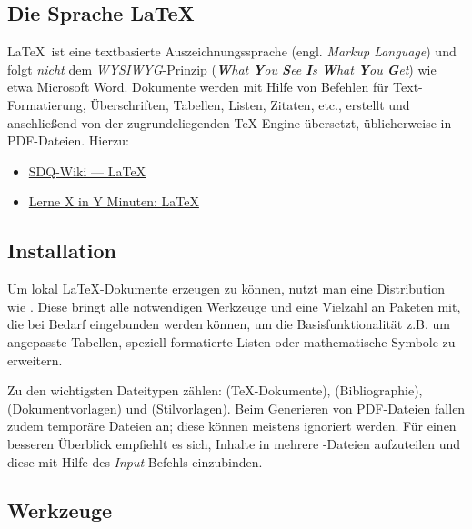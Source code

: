 \subsection{Die Sprache \LaTeX}%
\label{sec:Schreiben:Sprache}

\LaTeX\ ist eine textbasierte Auszeichnungssprache (engl. \emph{Markup Language}) und folgt \emph{nicht} dem \emph{WYSIWYG}-Prinzip (\emph{\textbf{W}hat \textbf{Y}ou \textbf{S}ee \textbf{I}s \textbf{W}hat \textbf{Y}ou \textbf{G}et}) wie etwa Microsoft Word.
Dokumente werden mit Hilfe von Befehlen für Text-Formatierung, Überschriften, Tabellen, Listen, Zitaten, etc., erstellt und anschließend von der zugrundeliegenden \TeX-Engine übersetzt, üblicherweise in PDF-Dateien.
Hierzu:

\smallskip
\begin{itemize}[label={\symbolInfo}]
    \item \href{https://sdqweb.ipd.kit.edu/wiki/LaTeX}{SDQ-Wiki --- LaTeX}
    \item \href{https://learnxinyminutes.com/docs/de-de/latex-de/}{Lerne X in Y Minuten: LaTeX}
\end{itemize}

\subsection{Installation}%
\label{sec:Schreiben:Installation}

Um lokal \LaTeX-Dokumente erzeugen zu können, nutzt man eine Distribution wie .
Diese bringt alle notwendigen Werkzeuge und eine Vielzahl an Paketen mit, die bei Bedarf eingebunden werden können, um die Basisfunktionalität z.B. um angepasste Tabellen, speziell formatierte Listen oder mathematische Symbole zu erweitern.

Zu den wichtigsten Dateitypen zählen:  (\TeX-Dokumente),  (Bibliographie),  (Dokumentvorlagen) und  (Stilvorlagen).
Beim Generieren von PDF-Dateien fallen zudem temporäre Dateien an; diese können meistens ignoriert werden.
Für einen besseren Überblick empfiehlt es sich, Inhalte in mehrere -Dateien aufzuteilen und diese mit Hilfe des \emph{Input}-Befehls einzubinden.

\subsection{Werkzeuge}%
\label{sec:Schreiben:Werkzeuge}

